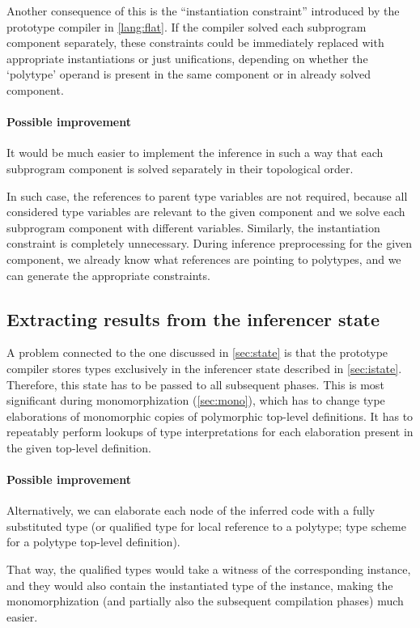 Another consequence of this is the ``instantiation constraint'' introduced by the prototype compiler in \cref{lang:flat}. If the compiler solved each subprogram component separately, these constraints could be immediately replaced with appropriate instantiations or just unifications, depending on whether the `polytype' operand is present in the same component or in already solved component.

\paragraph{Possible improvement}
It would be much easier to implement the inference in such a way that each subprogram component is solved separately in their topological order.

In such case, the references to parent type variables are not required, because all considered type variables are relevant to the given component and we solve each subprogram component with different variables. Similarly, the instantiation constraint is completely unnecessary. During inference preprocessing for the given component, we already know what references are pointing to polytypes, and we can generate the appropriate constraints.

\subsection{Extracting results from the inferencer state}
\label{sec:inferInter}

A problem connected to the one discussed in \cref{sec:state} is that the prototype compiler stores types exclusively in the inferencer state described in \cref{sec:istate}. Therefore, this state has to be passed to all subsequent phases. This is most significant during monomorphization (\cref{sec:mono}), which has to change type elaborations of monomorphic copies of polymorphic top-level definitions. It has to repeatably perform lookups of type interpretations for each elaboration present in the given top-level definition.

\paragraph{Possible improvement}
Alternatively, we can elaborate each node of the inferred code with a fully substituted type (or qualified type for local reference to a polytype; type scheme for a polytype top-level definition).

That way, the qualified types would take a witness of the corresponding instance, and they would also contain the instantiated type of the instance, making the monomorphization (and partially also the subsequent compilation phases) much easier.

